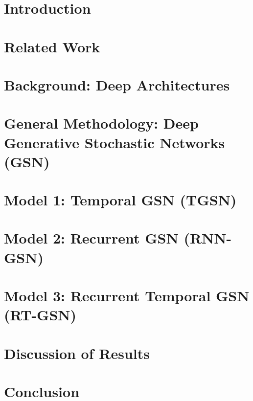 \documentclass[12pt, titlepage]{report}
\begin{document}
	\tableofcontents
	\listoffigures
	\listoftables
	
	\chapter{Introduction}
	
	
	\chapter{Related Work}
	
	
	\chapter{Background: Deep Architectures}
	
	
	\chapter{General Methodology: Deep Generative Stochastic Networks (GSN)}
	
	
	\chapter{Model 1: Temporal GSN (TGSN)}
	
	
	\chapter{Model 2: Recurrent GSN (RNN-GSN)}	
	

	\chapter{Model 3: Recurrent Temporal GSN (RT-GSN)}	
	
	
	\chapter{Discussion of Results}
	
	
	\chapter{Conclusion}
	
	
	
	
\end{document}
